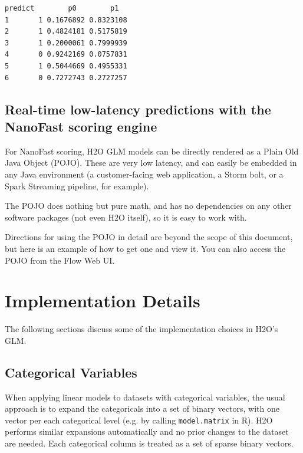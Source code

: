 
\begin{lstlisting}[style=output]
  predict        p0        p1
1       1 0.1676892 0.8323108
2       1 0.4824181 0.5175819
3       1 0.2000061 0.7999939
4       0 0.9242169 0.0757831
5       1 0.5044669 0.4955331
6       0 0.7272743 0.2727257
\end{lstlisting}

\subsection{Real-time low-latency predictions with the NanoFast scoring engine}

For NanoFast scoring, H2O GLM models can be directly rendered as a Plain Old Java Object (POJO).  These are very
low latency, and can easily be embedded in any Java environment (a customer-facing web application, a Storm bolt,
or a Spark Streaming pipeline, for example).

The POJO does nothing but pure math, and has no dependencies on any other software packages (not even H2O itself),
so it is easy to work with.

Directions for using the POJO in detail are beyond the scope of this document, but here is an example of how to get
one and view it.  You can also access the POJO from the Flow Web UI.

\bigskip
\waterExampleInR




\section{Implementation Details}

The following sections discuss some of the implementation choices in H2O's GLM.

\subsection{Categorical Variables}

When applying linear models to datasets with categorical variables, the usual approach is to expand the
categoricals into a set of binary vectors, with one vector per each categorical level (e.g. by calling
{\texttt{model.matrix}} in R). H2O performs similar expansions automatically and no prior changes to the dataset
are needed. Each categorical column is treated as a set of sparse binary vectors.

